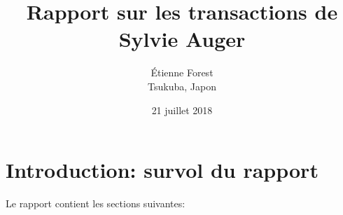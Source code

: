 \documentclass[french,12pt,article]{memoir} %
\title{\protect \large Rapport  sur les transactions  de Sylvie Auger}
\author{Étienne Forest \\ Tsukuba, Japon }
\date{21 juillet 2018} %
\begin{document}
 
\maketitle

\newpage 
{\footnotesize
\tableofcontents* %
}
\newpage 

\chapter{Introduction: survol du rapport}\label{secsurvol}

 
Le rapport contient les sections suivantes:

 
\end{document}
